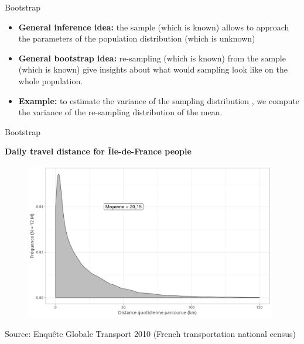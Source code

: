 \begin{frame}{Bootstrap}

\begin{itemize}
\item \textbf{General inference idea:} the sample (which is known) allows to approach the parameters of the population distribution (which is unknown)
\item \textbf{General bootstrap idea:} re-sampling (which is known) from the sample (which is known) give insights about what would sampling look like on the whole population.
\item \textbf{Example:} to estimate the variance of the sampling distribution , we compute the variance of the re-sampling distribution of the mean.
\end{itemize}

\end{frame}



\begin{frame}{Bootstrap}

\textbf{Daily travel distance for Île-de-France people}
\begin{figure}
\includegraphics[width=11cm]{PopDist.png}
\end{figure}

\footnotesize
Source: Enquête Globale Transport 2010 (French transportation national census)
\normalsize

\end{frame}




